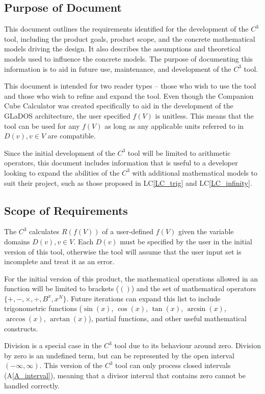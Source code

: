 \documentclass[12pt]{article}
\newcommand{\aref}[1]{A\ref{#1}}
\newcommand{\lcref}[1]{LC\ref{#1}}
\newcommand{\progname}{Companion Cube Calculator} %
\newcommand{\prognameAbbrv}{$C^{3}$}
\begin{document}
\subsection{Purpose of Document}
This document outlines the requirements identified for the development of the 
\prognameAbbrv{} tool, including the product goals, product scope, and the 
concrete mathematical models driving the design. It also describes the 
assumptions and theoretical models used to influence the concrete models. The 
purpose of documenting this information is to aid in future use, maintenance, 
and development of the \prognameAbbrv{} tool.

This document is intended for two reader types -- those who wish to use the 
tool and those who wish to refine and expand the tool. Even though the 
\progname{} was created specifically to aid in the development of the GLaDOS 
architecture, the user specified $f(V)$ is unitless. This means that the tool 
can be used for any $f(V)$ as long as any applicable units referred to in 
$D(v), v \in V$ are compatible.

Since the initial development of the \prognameAbbrv{} tool will be limited to 
arithmetic operators, this document includes information that is useful to a 
developer looking to expand the abilities of the \prognameAbbrv{} with 
additional mathematical models to suit their project, such as those proposed in 
\lcref{LC_trig} and \lcref{LC_infinity}. 

\subsection{Scope of Requirements} 
\label{sec_scope}
The \prognameAbbrv{} calculates $R(f(V))$ of a user-defined $f(V)$ given the 
variable domains $D(v), v \in V$. Each $D(v)$ must be specified by the user in 
the initial version of this tool, otherwise the tool will assume that the user 
input set is incomplete and treat it as an error.

For the initial version of this product, the mathematical operations allowed in 
an function will be limited to brackets ($()$) and the set of mathematical 
operators $\{+, -, \times, \div, B^x, x^N\}$. Future iterations can expand this 
list to include trigonometric functions ($\sin(x)$, $\cos(x)$, $\tan(x)$, 
$\arcsin(x)$, $\arccos(x)$, $\arctan(x)$), partial functions, and other useful 
mathematical constructs.

Division is a special case in the \prognameAbbrv{} tool due to its behaviour 
around zero. Division by zero is an undefined term, but can be represented by 
the open interval $(-\infty, \infty)$. This version of the \prognameAbbrv{} 
tool can only process closed intervals (\aref{A_interval}), meaning that a 
divisor interval that contains zero cannot be handled correctly. 
\end{document}

